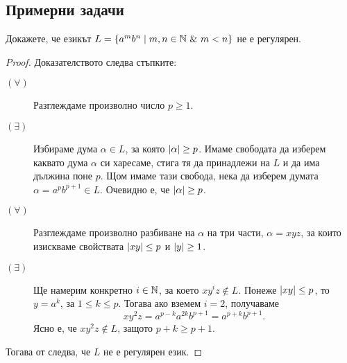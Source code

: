 \subsection{Примерни задачи}

\begin{extra}
\begin{problem}
  Докажете, че езикът $L = \{a^mb^n \mid m,n\in \mathbb{N}\ \&\ m < n\}$ не е регулярен.
\end{problem}
\begin{proof}
  Доказателството следва стъпките:
  \begin{description}
  \item[$(\forall)$]
    Разглеждаме произволно число $p \geq 1$.
  \item[$(\exists)$]
    Избираме дума $\alpha \in L$, за която $\vert{\alpha}\vert \geq p$. Имаме свободата да изберем каквато дума $\alpha$
    си харесаме, стига тя да принадлежи на $L$ и да има дължина поне $p$.
    Щом имаме тази свобода, нека да изберем думата $\alpha = a^{p}b^{p+1} \in L$. Очевидно е, че $\vert{\alpha}\vert \geq p$.
  \item[$(\forall)$]
    Разглеждаме произволно разбиване на $\alpha$ на три части, $\alpha = xyz$,
    за които изискваме свойствата $\vert{xy}\vert \leq p$ и $\vert{y}\vert \geq 1$.
  \item[$(\exists)$]
    Ще намерим конкретно $i\in\mathbb{N}$, за което $xy^iz \not\in L$.
    Понеже $\vert{xy}\vert \leq p$, то $y = a^k$, за  $1\leq k \leq p$.
    Тогава ако вземем $i = 2$, получаваме 
    \[xy^2z = a^{p-k}a^{2k}b^{p+1} = a^{p+k}b^{p+1}.\]
    Ясно е, че $xy^2z \not\in L$, защото $p+k \geq p+1$.
  \end{description}
  Тогава от  следва, че $L$ не е регулярен език.
\end{proof}


\end{extra}
